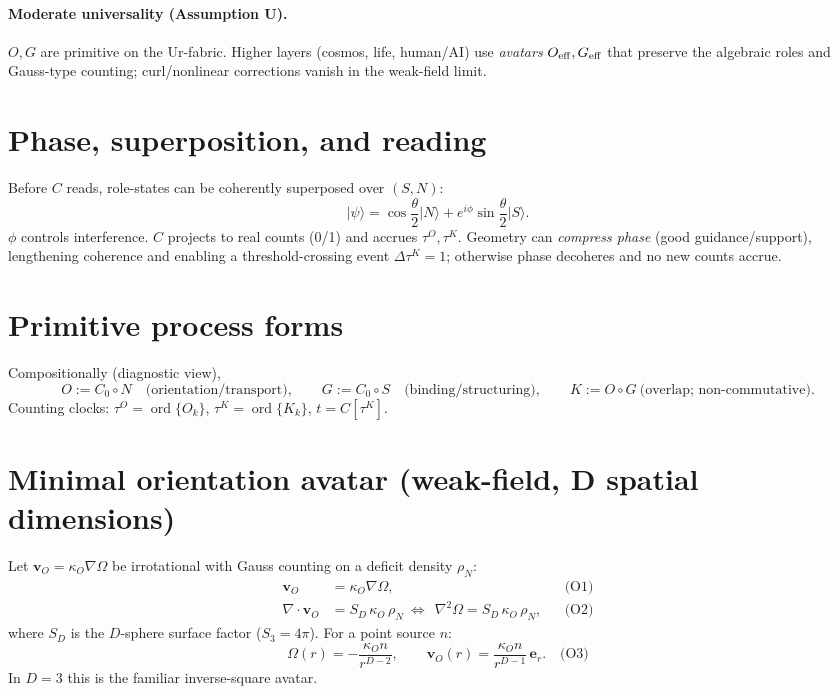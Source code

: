 \documentclass[12pt,a4paper,oneside]{scrreprt}
\def\({}%
\def\){}%
\begin{document}
\paragraph{Moderate universality (Assumption U).}
$O,G$ are primitive on the Ur-fabric. Higher layers (cosmos, life, human/AI) use \emph{avatars} $O_{\rm eff},G_{\rm eff}$ that preserve the algebraic roles and Gauss-type counting; curl/nonlinear corrections vanish in the weak-field limit.

\section{Phase, superposition, and reading}\label{sec:ur-phase}
Before $C$ reads, role-states can be coherently superposed over $(S,N)$:
\[
\lvert\psi\rangle=\cos\frac{\theta}{2}\lvert N\rangle+e^{i\phi}\sin\frac{\theta}{2}\lvert S\rangle.
\]
$\phi$ controls interference. $C$ projects to real counts (0/1) and accrues $\tau^O,\tau^K$. Geometry can \emph{compress phase} (good guidance/support), lengthening coherence and enabling a threshold-crossing event $\Delta\tau^K=1$; otherwise phase decoheres and no new counts accrue.

\section{Primitive process forms}\label{sec:ur-primitives}
Compositionally (diagnostic view),
\begin{equation}
O:=C_0\!\circ N\quad\text{(orientation/transport)},\qquad
G:=C_0\!\circ S\quad\text{(binding/structuring)},\qquad
K:=O\!\circ G\ \text{(overlap; non-commutative)}.
\end{equation}
Counting clocks: $\tau^O=\operatorname{ord}\{O_k\}$, $\tau^K=\operatorname{ord}\{K_k\}$, $t=C[\tau^K]$.

\section{Minimal orientation avatar (weak-field, \(D\) spatial dimensions)}\label{sec:ur-orientation}
Let $\mathbf v_O=\kappa_O\nabla\Omega$ be irrotational with Gauss counting on a deficit density $\rho_N$:
\begin{align}
\mathbf v_O&=\kappa_O\nabla\Omega, &&\text{(O1)}\\
\nabla\!\cdot\mathbf v_O&=S_D\,\kappa_O\,\rho_N 
\ \Longleftrightarrow\ \ \nabla^2\Omega=S_D\,\kappa_O\,\rho_N, &&\text{(O2)}
\end{align}
where $S_D$ is the $D$-sphere surface factor ($S_3=4\pi$). For a point source $n$:
\begin{equation}
\Omega(r)=-\frac{\kappa_On}{r^{D-2}},\qquad 
\mathbf v_O(r)=\frac{\kappa_On}{r^{D-1}}\,\mathbf e_r.\quad\text{(O3)}
\end{equation}
In $D\!=\!3$ this is the familiar inverse-square avatar.
\end{document}
